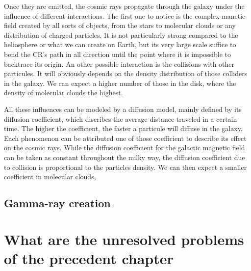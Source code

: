 Once they are emitted, the cosmic rays propagate through the galaxy under the influence of different interactions.
The first one to notice is the complex manetic field created by all sorts of objects, from the stars to molecular clouds or any distribution of charged particles. It is not particularly strong  compared to the heliosphere or what we can create on Earth, but its very large scale suffice to bend the CR's path in all direction until the point where it is impossible to backtrace its origin.
An other possible interaction is the collisions with other particules. It will obviously depends on the density distribution of those colliders in the galaxy. We can expect a higher number of those in the disk, where the density of molecular clouds the highest.

All these influences can be modeled by a diffusion model, mainly defined by its diffusion coefficient, which discribes the average distance traveled in a certain time. The higher the coefficient, the faster a particule will diffuse in the galaxy. Each phenomenon can be attributed one of those coefficient to describe its effect on the cosmic rays. 
While the diffusion coefficient for the galactic magnetic field can be taken as constant throughout the milky way, the diffusion coefficient due to collision is proportional to the particles density. We can then expect a smaller coefficient in molecular clouds, 

\subsection{Gamma-ray creation}



\section{What are the unresolved problems of the precedent chapter}
%










